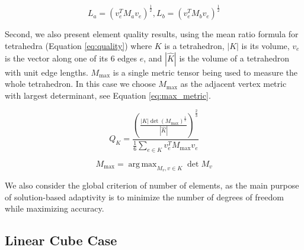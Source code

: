 \documentclass[3p,times,procedia,number]{elsarticle}
\DeclareMathOperator*{\argmax}{arg\,max}
\begin{document}
\begin{equation}
\label{eq:endpoint_lengths}
L_a = (v_e^T M_a v_e)^{\frac12},
L_b = (v_e^T M_b v_e)^{\frac12}
\end{equation}

Second, we also present element quality results, using the
mean ratio formula for tetrahedra (Equation \ref{eq:quality})
where $K$ is a tetrahedron, $|K|$ is its volume,
$v_e$ is the vector along one of its 6 edges $e$,
and $|\hat{K}|$ is the volume of a tetrahedron
with unit edge lengths.
$M_{\text{max}}$ is a single metric tensor
being used to measure the whole tetrahedron.
In this case we choose $M_{\text{max}}$ as the
adjacent vertex metric with largest determinant,
see Equation \ref{eq:max_metric}.

\begin{equation}
\label{eq:quality}
Q_K =
 \frac{\left(\frac{|K|\det(M_{\text{max}})^{\frac12}}
                  {|\hat{K}|}
       \right)^{\frac{2}{3}}}
      {\frac16\sum_{e\in K}{v_e^T M_{\text{max}} v_e}}
\end{equation}

\begin{equation}
\label{eq:max_metric}
M_{\text{max}} = \argmax_{M_v, v\in K}{\det{M_v}}
\end{equation}

We also consider the global criterion of number of elements,
as the main purpose of solution-based adaptivity is to
minimize the number of degrees of freedom while maximizing
accuracy.

\subsection{Linear Cube Case}
\end{document}
